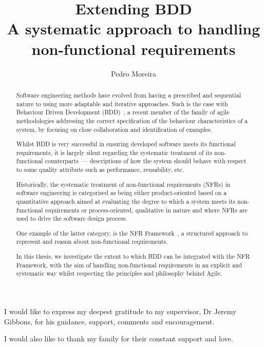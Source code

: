 \documentclass[dissertation]{softeng}
\title{Extending BDD\\A systematic approach to handling non-functional requirements}
\author{Pedro Moreira}
\begin{document}
\maketitle


\begin{abstract}
Software engineering methods have evolved from having a prescribed and sequential nature to using more adaptable and iterative approaches. Such is the case with Behaviour Driven Development (BDD)~\cite{North2006,Smart201410}, a recent member of the family of agile methodologies addressing the correct specification of the behaviour characteristics of a system, by focusing on close collaboration and identification of examples.

Whilst BDD is very successful in ensuring developed software meets its functional requirements, it is largely silent regarding the systematic treatment of its non-functional counterparts~--- descriptions of how the system should behave with respect to some quality attribute such as performance, reusability, etc.

Historically, the systematic treatment of non-functional requirements (NFRs) in software engineering is categorised as being either product-oriented based on a quantitative approach aimed at evaluating the degree to which a system meets its non-functional requirements or process-oriented, qualitative in nature and where NFRs are used to drive the software design process.

One example of the latter category, is the NFR Framework~\cite{Chung2000}, a structured approach to represent and reason about non-functional requirements. 

In this thesis, we investigate the extent to which BDD can be integrated with the NFR Framework, with the aim of handling non-functional requirements in an explicit and systematic way whilst respecting the principles and philosophy behind Agile.
\end{abstract}

\clearpage

\begin{acknowledgements}
  I would like to express my deepest gratitude to my supervisor, Dr Jeremy Gibbons, for his
  guidance, support, comments and encouragement.
  
  I would also like to thank my family for their constant support and love.
\end{acknowledgements}

\clearpage

\pagestyle{plain}
\setcounter{tocdepth}{2}
\end{document}
